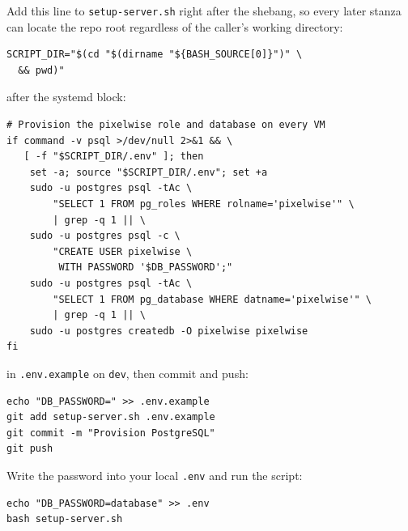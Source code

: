 
Add this line to \texttt{setup-server.sh} right after the shebang, so
every later stanza can locate the repo root regardless of the caller's
working directory:

\begin{verbatim}
SCRIPT_DIR="$(cd "$(dirname "${BASH_SOURCE[0]}")" \
  && pwd)"
\end{verbatim}

 after the systemd block:

\begin{verbatim}
# Provision the pixelwise role and database on every VM
if command -v psql >/dev/null 2>&1 && \
   [ -f "$SCRIPT_DIR/.env" ]; then
    set -a; source "$SCRIPT_DIR/.env"; set +a
    sudo -u postgres psql -tAc \
        "SELECT 1 FROM pg_roles WHERE rolname='pixelwise'" \
        | grep -q 1 || \
    sudo -u postgres psql -c \
        "CREATE USER pixelwise \
         WITH PASSWORD '$DB_PASSWORD';"
    sudo -u postgres psql -tAc \
        "SELECT 1 FROM pg_database WHERE datname='pixelwise'" \
        | grep -q 1 || \
    sudo -u postgres createdb -O pixelwise pixelwise
fi
\end{verbatim}

 in \texttt{.env.example} on
\texttt{dev}, then commit and push:

\begin{verbatim}
echo "DB_PASSWORD=" >> .env.example
git add setup-server.sh .env.example
git commit -m "Provision PostgreSQL"
git push
\end{verbatim}

\newthought{Apply on \texttt{dev} first.}
Write the password into your local \texttt{.env} and run the script:

\begin{verbatim}
echo "DB_PASSWORD=database" >> .env
bash setup-server.sh
\end{verbatim}

